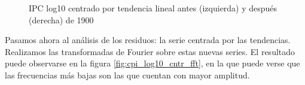 \documentclass[a4paper]{article}
\begin{document}
\begin{figure}[H]
	\centering
	\caption{IPC log10 centrado por tendencia lineal antes (izquierda) y después (derecha) de 1900} 	
	\label{fig:cpi_log10_cntr}
\end{figure}

Pasamos ahora al análisis de los residuos: la serie centrada por las tendencias. Realizamos las transformadas de Fourier sobre estas nuevas series. El resultado puede observarse en la figura \ref{fig:cpi_log10_cntr_fft}, en la que puede verse que las frecuencias más bajas son las que cuentan con mayor amplitud.
\end{document}
